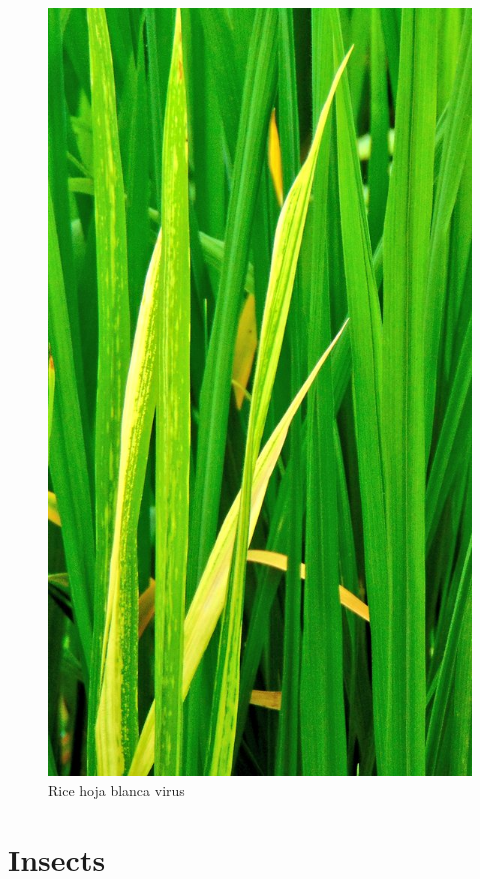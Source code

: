 \documentclass[10pt,dvipsnames,ignorenonframetext,aspectratio=169]{beamer}
\begin{document}
\begin{frame}{}
\protect\hypertarget{section-12}{}
\begin{figure}
\includegraphics[width=0.25\linewidth]{../images/rice_hoja_blanca_virus} \caption{Rice hoja blanca virus}\label{fig:rice-hoja-blanca-virus}
\end{figure}
\end{frame}

\hypertarget{insects}{%
\section{Insects}\label{insects}}
\end{document}
